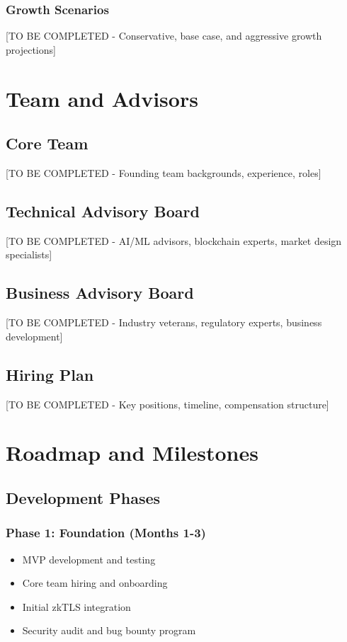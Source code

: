 \documentclass[11pt,a4paper]{article}
\begin{document}
\subsubsection{Growth Scenarios}
[TO BE COMPLETED - Conservative, base case, and aggressive growth projections]

\section{Team and Advisors}

\subsection{Core Team}
[TO BE COMPLETED - Founding team backgrounds, experience, roles]

\subsection{Technical Advisory Board}
[TO BE COMPLETED - AI/ML advisors, blockchain experts, market design specialists]

\subsection{Business Advisory Board}
[TO BE COMPLETED - Industry veterans, regulatory experts, business development]

\subsection{Hiring Plan}
[TO BE COMPLETED - Key positions, timeline, compensation structure]

\section{Roadmap and Milestones}

\subsection{Development Phases}

\subsubsection{Phase 1: Foundation (Months 1-3)}
\begin{itemize}
    \item MVP development and testing
    \item Core team hiring and onboarding
    \item Initial zkTLS integration
    \item Security audit and bug bounty program
\end{itemize}
\end{document}
